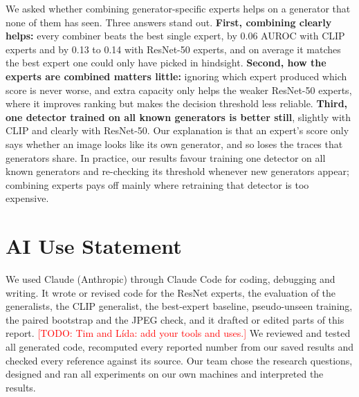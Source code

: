 \documentclass[10pt,a4paper]{article}
\newcommand{\todo}[1]{\textcolor{red}{[TODO: #1]}}
\begin{document}
We asked whether combining generator-specific experts helps on a generator that none of them has seen. Three answers stand out. \textbf{First, combining clearly helps:} every combiner beats the best single expert, by 0.06 AUROC with CLIP experts and by 0.13 to 0.14 with ResNet-50 experts, and on average it matches the best expert one could only have picked in hindsight. \textbf{Second, how the experts are combined matters little:} ignoring which expert produced which score is never worse, and extra capacity only helps the weaker ResNet-50 experts, where it improves ranking but makes the decision threshold less reliable. \textbf{Third, one detector trained on all known generators is better still}, slightly with CLIP and clearly with ResNet-50. Our explanation is that an expert's score only says whether an image looks like its own generator, and so loses the traces that generators share. In practice, our results favour training one detector on all known generators and re-checking its threshold whenever new generators appear; combining experts pays off mainly where retraining that detector is too expensive.

\section*{AI Use Statement}
We used Claude (Anthropic) through Claude Code for coding, debugging and writing. It wrote or revised code for the ResNet experts, the evaluation of the generalists, the CLIP generalist, the best-expert baseline, pseudo-unseen training, the paired bootstrap and the JPEG check, and it drafted or edited parts of this report. \todo{Tim and Lída: add your tools and uses.} We reviewed and tested all generated code, recomputed every reported number from our saved results and checked every reference against its source. Our team chose the research questions, designed and ran all experiments on our own machines and interpreted the results.

\clearpage
{}
\end{document}
